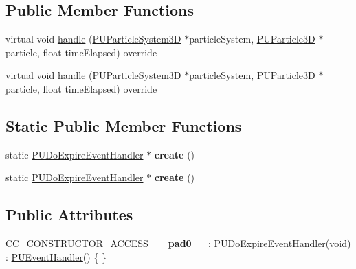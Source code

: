 \subsection*{Public Member Functions}
\begin{DoxyCompactItemize}
\item 
virtual void \hyperlink{classPUDoExpireEventHandler_a28cf9f9bea21b57152c12c52ff6eff91}{handle} (\hyperlink{classPUParticleSystem3D}{P\+U\+Particle\+System3D} $\ast$particle\+System, \hyperlink{structPUParticle3D}{P\+U\+Particle3D} $\ast$particle, float time\+Elapsed) override
\item 
virtual void \hyperlink{classPUDoExpireEventHandler_a13edfa6a313f4306bb4815c670d98689}{handle} (\hyperlink{classPUParticleSystem3D}{P\+U\+Particle\+System3D} $\ast$particle\+System, \hyperlink{structPUParticle3D}{P\+U\+Particle3D} $\ast$particle, float time\+Elapsed) override
\end{DoxyCompactItemize}
\subsection*{Static Public Member Functions}
\begin{DoxyCompactItemize}
\item 
\mbox{\label{classPUDoExpireEventHandler_a9de8c992fa2567ed982a2d41ff39d2a3}} 
static \hyperlink{classPUDoExpireEventHandler}{P\+U\+Do\+Expire\+Event\+Handler} $\ast$ {\bfseries create} ()
\item 
\mbox{\label{classPUDoExpireEventHandler_a2bda3a496e602b0b8baced82fc52485f}} 
static \hyperlink{classPUDoExpireEventHandler}{P\+U\+Do\+Expire\+Event\+Handler} $\ast$ {\bfseries create} ()
\end{DoxyCompactItemize}
\subsection*{Public Attributes}
\begin{DoxyCompactItemize}
\item 
\mbox{\label{classPUDoExpireEventHandler_aad37f579b92c5ef4e9e8ac567616b3d6}} 
\hyperlink{_2cocos2d_2cocos_2base_2ccConfig_8h_a25ef1314f97c35a2ed3d029b0ead6da0}{C\+C\+\_\+\+C\+O\+N\+S\+T\+R\+U\+C\+T\+O\+R\+\_\+\+A\+C\+C\+E\+SS} {\bfseries \+\_\+\+\_\+pad0\+\_\+\+\_\+}\+: \hyperlink{classPUDoExpireEventHandler}{P\+U\+Do\+Expire\+Event\+Handler}(void) \+: \hyperlink{classPUEventHandler}{P\+U\+Event\+Handler}() \{ \}
\end{DoxyCompactItemize}
